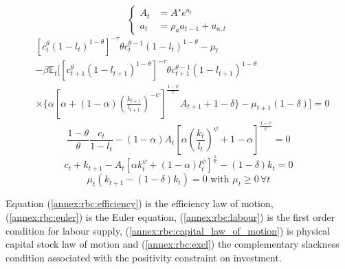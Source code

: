 \documentclass[a4paper,12pt]{amsart}
\begin{document}
\begin{equation}
   \label{annex:rbc:efficiency}
   \begin{cases}
      A_t & = A^{\star}e^{a_t}         \\
      a_t & = \rho_a a_{t-1} + u_{a,t}
   \end{cases}
\end{equation}
\begin{equation}
   \label{annex:rbc:euler}
   \begin{split}
       & \left[c_t^{\theta}(1-l_t)^{1-\theta}\right]^{-\tau}\theta c_t^{\theta-1}(1-l_t)^{1-\theta}-\mu_t                                                                              \\ &-
      \beta \mathbb E_t \Biggl[\left[c_{t+1}^{\theta}(1-l_{t+1})^{1-\theta}\right]^{-\tau}\theta c_{t+1}^{\theta-1}(1-l_{t+1})^{1-\theta}                                              \\
       & \times \Biggl\{\alpha \left[\alpha+(1-\alpha)\left(\frac{k_{t+1}}{l_{t+1}}\right)^{-\psi}\right]^{\frac{1-\psi}{\psi}}A_{t+1}+1-\delta\Biggr\}-\mu_{t+1}(1-\delta)\Biggr] = 0
   \end{split}
\end{equation}
\begin{equation}
   \label{annex:rbc:labour}
   \frac{1-\theta}{ \theta}\frac{c_t}{1-l_t} - (1-\alpha)A_t\left[\alpha \left(\frac{k_t}{l_t}\right)^{\psi}+1-\alpha\right]^{\frac{1-\psi}{\psi}} = 0
\end{equation}
\begin{equation}
   \label{annex:rbc:capital_law_of_motion}
   c_t + k_{t+1} - A_t\left[\alpha k_t^{\psi} + (1-\alpha) l_t^{\psi}\right]^{\frac{1}{\psi}}- (1-\delta)k_t = 0
\end{equation}
\begin{equation}
   \label{annex:rbc:excl}
   \mu_t \left(k_{t+1}-(1-\delta)k_t\right) = 0\text{ with }\mu_t\geq 0 \, \forall t
\end{equation}
\newline

Equation (\ref{annex:rbc:efficiency}) is the efficiency law of
motion, (\ref{annex:rbc:euler}) is the Euler equation,
(\ref{annex:rbc:labour}) is the first order condition for labour
supply, (\ref{annex:rbc:capital_law_of_motion}) is physical capital
stock law of motion and (\ref{annex:rbc:excl}) the complementary slackness condition
associated with the positivity constraint on investment.\newline
\end{document}
